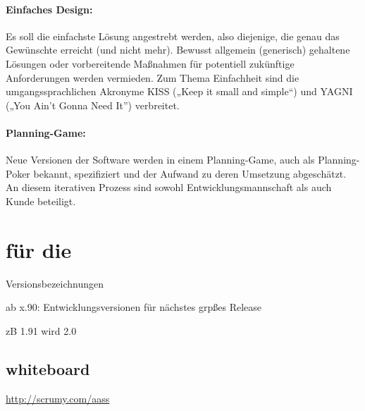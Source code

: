 \documentclass[fontsize=9pt,paper=a4,parskip=half,DIV=11,twocolumn]{scrartcl}
\begin{document}

\paragraph{Einfaches Design:} Es soll die einfachste Lösung angestrebt werden,
also diejenige, die genau das Gewünschte erreicht (und nicht mehr). Bewusst allgemein
(generisch) gehaltene Lösungen oder vorbereitende Maßnahmen für potentiell
zukünftige Anforderungen werden vermieden. Zum Thema Einfachheit sind die
umgangssprachlichen Akronyme KISS („Keep it small and simple“) und YAGNI („You
Ain’t Gonna Need It”) verbreitet.

\paragraph{Planning-Game:} Neue Versionen der Software werden in einem
Planning-Game, auch als Planning-Poker bekannt, spezifiziert und der Aufwand zu deren Umsetzung
abgeschätzt. An diesem iterativen Prozess sind sowohl Entwicklungsmannschaft als
auch Kunde beteiligt.





\section{\ADCD{} für die \AASS}

Versionsbezeichnungen

ab x.90: Entwicklungsversionen für nächstes grpßes Release

zB 1.91 wird 2.0

\subsection{whiteboard}

\url{http://scrumy.com/aass}
\end{document}

